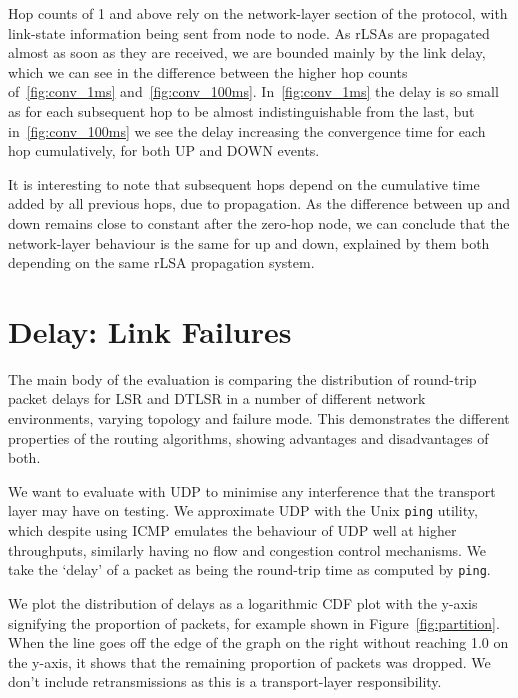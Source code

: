\documentclass[withindex,glossary,openany]{cam-thesis}
\begin{document}
Hop counts of 1 and above rely on the network-layer section of the protocol, with link-state information being sent from node to node. As rLSAs are propagated almost as soon as they are received, we are bounded mainly by the link delay, which we can see in the difference between the higher hop counts of~\ref{fig:conv_1ms} and~\ref{fig:conv_100ms}. In~\ref{fig:conv_1ms} the delay is so small as for each subsequent hop to be almost indistinguishable from the last, but in~\ref{fig:conv_100ms} we see the delay increasing the convergence time for each hop cumulatively, for both UP and DOWN events.

It is interesting to note that subsequent hops depend on the cumulative time added by all previous hops, due to propagation. As the difference between up and down remains close to constant after the zero-hop node, we can conclude that the network-layer behaviour is the same for up and down, explained by them both depending on the same rLSA propagation system.


\section{Delay: Link Failures}

The main body of the evaluation is comparing the distribution of round-trip packet delays for LSR and DTLSR in a number of different network environments, varying topology and failure mode. This demonstrates the different properties of the routing algorithms, showing advantages and disadvantages of both.

We want to evaluate with UDP to minimise any interference that the transport layer may have on testing. We approximate UDP with the Unix \texttt{ping} utility, which despite using ICMP emulates the behaviour of UDP well at higher throughputs, similarly having no flow and congestion control mechanisms. We take the `delay' of a packet as being the round-trip time as computed by \texttt{ping}.


We plot the distribution of delays as a logarithmic CDF plot with the y-axis signifying the proportion of packets, for example shown in Figure~\ref{fig:partition}. When the line goes off the edge of the graph on the right without reaching 1.0 on the y-axis, it shows that the remaining proportion of packets was dropped. We don't include retransmissions as this is a transport-layer responsibility.
\end{document}
